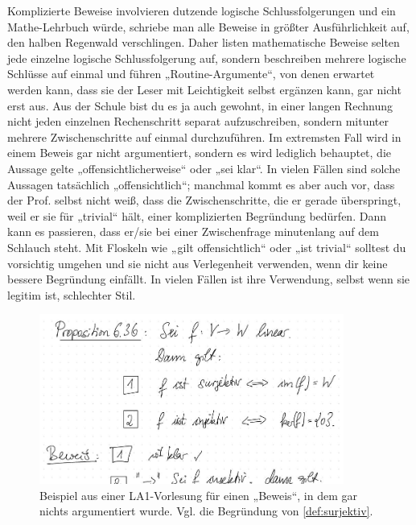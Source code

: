 \begin{bem}
    Komplizierte Beweise involvieren dutzende logische Schlussfolgerungen und ein Mathe-Lehrbuch würde, schriebe man alle Beweise in größter Ausführlichkeit auf, den halben Regenwald verschlingen. Daher listen mathematische Beweise selten jede einzelne logische Schlussfolgerung auf, sondern beschreiben mehrere logische Schlüsse auf einmal und führen „Routine-Argumente“, von denen erwartet werden kann, dass sie der Leser mit Leichtigkeit selbst ergänzen kann, gar nicht erst aus. Aus der Schule bist du es ja auch gewohnt, in einer langen Rechnung nicht jeden einzelnen Rechenschritt separat aufzuschreiben, sondern mitunter mehrere Zwischenschritte auf einmal durchzuführen. Im extremsten Fall wird in einem Beweis gar nicht argumentiert, sondern es wird lediglich behauptet, die Aussage gelte „offensichtlicherweise“ oder „sei klar“. In vielen Fällen sind solche Aussagen tatsächlich „offensichtlich“; manchmal kommt es aber auch vor, dass der Prof. selbst nicht weiß, dass die Zwischenschritte, die er gerade überspringt, weil er sie für „trivial“ hält, einer komplizierten Begründung bedürfen. Dann kann es passieren, dass er/sie bei einer Zwischenfrage minutenlang auf dem Schlauch steht. Mit Floskeln wie „gilt offensichtlich“ oder „ist trivial“ solltest du vorsichtig umgehen und sie nicht aus Verlegenheit verwenden, wenn dir keine bessere Begründung einfällt. In vielen Fällen ist ihre Verwendung, selbst wenn sie legitim ist, schlechter Stil.
    \begin{figure}[ht]
        \includegraphics[width=10cm]{./_img/Istklar.jpeg}
        \centering \caption{Beispiel aus einer LA1-Vorlesung für einen „Beweis“, in dem gar nichts argumentiert wurde. Vgl. die Begründung von \cref{def:surjektiv}.}
    \end{figure}
\end{bem}


